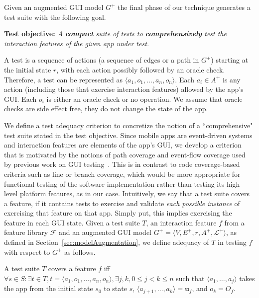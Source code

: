 \label{sec:testSuiteDefinition}

Given an augmented GUI model $G^+$ the final phase of our technique generates a test suite with the following goal.

\noindent\textbf{Test objective:} \textit{A \textbf{compact} suite of tests to \textbf{comprehensively} test the interaction features of the given app under test.}

 A test is a sequence of actions (\ie a sequence of edges or a path in $G^+$) starting at the initial state $r$, with each action possibly followed by an oracle check. Therefore, a test can be represented as $\langle a_1, o_1, \dots, a_n, o_n \rangle$. Each $a_i \in A^+$ is any action (including those that exercise interaction features) allowed by the app's GUI. Each $o_i$ is either an oracle check or no operation. We assume that oracle checks are side effect free, \ie they do not change the state of the app.

We define a test adequacy criterion to concretize the notion of a ``comprehensive" test suite stated in the test objective. Since mobile apps are event-driven systems and interaction features are elements of the app's GUI, we develop a criterion that is motivated by the notions of path coverage and event-flow coverage used by previous work on GUI testing~\cite{memon2001coverage}. This is in contrast to code coverage-based criteria such as line or branch coverage, which would be more appropriate for functional testing of the software implementation rather than testing its high level platform features, as in our case. Intuitively, we say that a test suite covers a feature, if it contains tests to exercise and validate \textit{each possible instance} of exercising that feature on that app. Simply put, this implies exercising the feature in each GUI state. Given a test suite $T$, an interaction feature $f$ from a feature library $\mathcal{F}$ and an augmented GUI model $G^+ = \langle V, E^+, r, A^+, \mathcal{L}^+ \rangle$, as defined in Section~\ref{sec:modelAugmentation}, we define adequacy of $T$ in testing $f$ with respect to $G^+$ as follows.

\begin{mydef}
\label{def:coverage}
A test suite $T$ covers a feature $f$ iff $\forall s \in S: \exists t \in T, t = \langle a_1, o_1, \dots, a_n, o_n  \rangle, \exists j, k, 0 \leq j < k \leq n$ such that $\langle a_1, \dots, a_j \rangle$ takes the app from the initial state $s_0$ to state $s$, $\langle a_{j+1}, \dots, a_k \rangle = \mathbf{u}_f$, and $o_k = O_f$.
\end{mydef}
\vspace*{-2ex}

